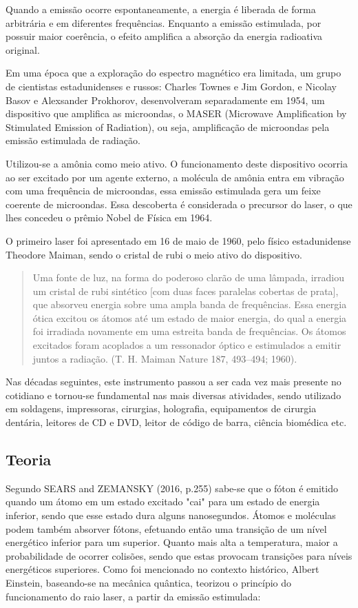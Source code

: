 \documentclass{fei}
\begin{document}
Quando a emissão ocorre espontaneamente, a energia é liberada de forma arbitrária e em diferentes frequências. Enquanto a emissão estimulada, por possuir maior coerência, o efeito amplifica a absorção da energia radioativa original.

Em uma época que a exploração do espectro magnético era limitada, um grupo de cientistas estadunidenses e russos: Charles Townes e Jim Gordon, e Nicolay Basov e Alexsander Prokhorov, desenvolveram separadamente em 1954, um dispositivo que amplifica as microondas, o MASER (Microwave Amplification by Stimulated Emission of Radiation), ou seja, amplificação de microondas pela emissão estimulada de radiação.

Utilizou-se a amônia como meio ativo. O funcionamento deste dispositivo ocorria ao ser excitado por um agente externo, a molécula de amônia entra em vibração com uma frequência de microondas, essa emissão estimulada gera um feixe coerente de microondas. Essa descoberta é considerada o precursor do laser, o que lhes concedeu o prêmio Nobel de Física em 1964.

O primeiro laser foi apresentado em 16 de maio de 1960, pelo físico estadunidense Theodore Maiman, sendo o cristal de rubi o meio ativo do dispositivo.

\begin{quote}
Uma fonte de luz, na forma do poderoso clarão de uma lâmpada, irradiou um cristal de rubi sintético [com duas faces paralelas cobertas de prata], que absorveu energia sobre uma ampla banda de frequências. Essa energia ótica excitou os átomos até um estado de maior energia, do qual a energia foi irradiada novamente em uma estreita banda de frequências. Os átomos excitados foram acoplados a um ressonador óptico e estimulados a emitir juntos a radiação. (T. H. Maiman Nature 187, 493–494; 1960).
\end{quote}

Nas décadas seguintes, este instrumento passou a ser cada vez mais presente no cotidiano e tornou-se fundamental nas mais diversas atividades, sendo utilizado em soldagens, impressoras, cirurgias, holografia, equipamentos de cirurgia dentária, leitores de CD e DVD, leitor de código de barra, ciência biomédica etc.

\subsection{Teoria}

\par
Segundo \textcite{sears} SEARS and ZEMANSKY (2016, p.255) sabe-se que o fóton é emitido quando um átomo em um estado excitado "cai" para um estado de energia inferior, sendo que esse estado dura alguns nanosegundos. Átomos e moléculas podem também absorver fótons, efetuando então uma transição de um nível energético inferior para um superior. Quanto mais alta a temperatura, maior a probabilidade de ocorrer colisões, sendo que estas provocam transições para níveis energéticos superiores.
Como foi mencionado no contexto histórico, Albert Einstein, baseando-se na mecânica quântica, teorizou o princípio do funcionamento do raio laser, a partir da emissão estimulada:
\end{document}
